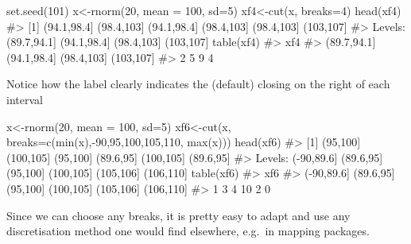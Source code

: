 \documentclass[
  letterpaper,
  DIV=11,
  numbers=noendperiod]{scrreprt}
\newenvironment{Shaded}{\begin{snugshade}}{\end{snugshade}}
\newcommand{\AttributeTok}[1]{\textcolor[rgb]{0.40,0.45,0.13}{#1}}
\newcommand{\CommentTok}[1]{\textcolor[rgb]{0.37,0.37,0.37}{#1}}
\newcommand{\DecValTok}[1]{\textcolor[rgb]{0.68,0.00,0.00}{#1}}
\newcommand{\FunctionTok}[1]{\textcolor[rgb]{0.28,0.35,0.67}{#1}}
\newcommand{\NormalTok}[1]{\textcolor[rgb]{0.00,0.23,0.31}{#1}}
\newcommand{\OtherTok}[1]{\textcolor[rgb]{0.00,0.23,0.31}{#1}}
\newcommand{\SpecialCharTok}[1]{\textcolor[rgb]{0.37,0.37,0.37}{#1}}
\begin{document}
\begin{Shaded}
\begin{Highlighting}[]
\FunctionTok{set.seed}\NormalTok{(}\DecValTok{101}\NormalTok{)}
\NormalTok{x}\OtherTok{\textless{}{-}}\FunctionTok{rnorm}\NormalTok{(}\DecValTok{20}\NormalTok{, }\AttributeTok{mean =} \DecValTok{100}\NormalTok{, }\AttributeTok{sd=}\DecValTok{5}\NormalTok{)}
\NormalTok{xf4}\OtherTok{\textless{}{-}}\FunctionTok{cut}\NormalTok{(x, }\AttributeTok{breaks=}\DecValTok{4}\NormalTok{)}
\FunctionTok{head}\NormalTok{(xf4)}
\CommentTok{\#\textgreater{} [1] (94.1,98.4] (98.4,103]  (94.1,98.4] (98.4,103]  (98.4,103]  (103,107]  }
\CommentTok{\#\textgreater{} Levels: (89.7,94.1] (94.1,98.4] (98.4,103] (103,107]}
\FunctionTok{table}\NormalTok{(xf4)}
\CommentTok{\#\textgreater{} xf4}
\CommentTok{\#\textgreater{} (89.7,94.1] (94.1,98.4]  (98.4,103]   (103,107] }
\CommentTok{\#\textgreater{}           2           5           9           4}
\end{Highlighting}
\end{Shaded}

Notice how the label clearly indicates the (default) closing on the
right of each interval

\begin{Shaded}
\begin{Highlighting}[]
\NormalTok{x}\OtherTok{\textless{}{-}}\FunctionTok{rnorm}\NormalTok{(}\DecValTok{20}\NormalTok{, }\AttributeTok{mean =} \DecValTok{100}\NormalTok{, }\AttributeTok{sd=}\DecValTok{5}\NormalTok{)}
\NormalTok{xf6}\OtherTok{\textless{}{-}}\FunctionTok{cut}\NormalTok{(x, }\AttributeTok{breaks=}\FunctionTok{c}\NormalTok{(}\FunctionTok{min}\NormalTok{(x),}\SpecialCharTok{{-}}\DecValTok{90}\NormalTok{,}\DecValTok{95}\NormalTok{,}\DecValTok{100}\NormalTok{,}\DecValTok{105}\NormalTok{,}\DecValTok{110}\NormalTok{, }\FunctionTok{max}\NormalTok{(x)))}
\FunctionTok{head}\NormalTok{(xf6)}
\CommentTok{\#\textgreater{} [1] (95,100]  (100,105] (95,100]  (89.6,95] (100,105] (89.6,95]}
\CommentTok{\#\textgreater{} Levels: ({-}90,89.6] (89.6,95] (95,100] (100,105] (105,106] (106,110]}
\FunctionTok{table}\NormalTok{(xf6)}
\CommentTok{\#\textgreater{} xf6}
\CommentTok{\#\textgreater{} ({-}90,89.6]  (89.6,95]   (95,100]  (100,105]  (105,106]  (106,110] }
\CommentTok{\#\textgreater{}          1          3          4         10          2          0}
\end{Highlighting}
\end{Shaded}

Since we can choose any breaks, it is pretty easy to adapt and use any
discretisation method one would find elsewhere, e.g.~in mapping
packages.
\end{document}
